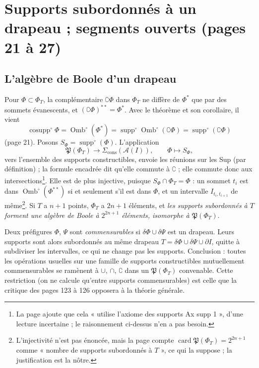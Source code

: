\documentclass[11pt,a4paper]{article}
\begin{document}
\section*{Supports subordonnés à un drapeau ; segments ouverts (pages 21 à 27)}

\subsection*{L'algèbre de Boole d'un drapeau}

Pour $\Phi \subset \Phi_{T}$, la complémentaire $\complement\Phi$ dans
$\Phi_{T}$ ne diffère de $\Phi^{*}$ que par des sommets évanescents, et
$(\complement\Phi)^{**} = \Phi^{*}$. Avec le théorème et son corollaire, il
vient
\[
\boxed{\ \operatorname{cosupp}^{\circ}\Phi = \operatorname{Omb}^{\circ}(\Phi^{*})
= \operatorname{supp}^{\circ}\operatorname{Omb}^{\circ}(\complement\Phi) =
\operatorname{supp}^{\circ}(\complement\Phi)\ }
\]
(page 21). Posons $S_{\Phi} = \operatorname{supp}^{\circ}(\Phi)$. L'application
\[
\mathfrak{P}(\Phi_{T}) \longrightarrow \Sigma_{\mathrm{cons}}(\mathcal{A}(I)),
\qquad \Phi \longmapsto S_{\Phi},
\]
vers l'ensemble des supports constructibles, envoie les réunions sur les Sup (par
définition) ; la formule encadrée dit qu'elle commute à $\complement$ ; elle
commute donc aux intersections\footnote{La page ajoute que cela « utilise
l'axiome des supports Ax supp 1 », d'une lecture incertaine ; le raisonnement
ci-dessus n'en a pas besoin.}. Elle est de plus injective, puisque $S_{\Phi} \cap
\Phi_{T} = \Phi$ : un sommet $t_{i}$ est dans $\operatorname{Omb}^{\circ}(\Phi^{**})$
si et seulement s'il est dans $\Phi$, et un intervalle $I_{t_{i},t_{i+1}}$ de
même\footnote{L'injectivité n'est pas énoncée, mais la page compte
$\operatorname{card}\mathfrak{P}(\Phi_{T}) = 2^{2n+1}$ comme « nombre de supports
subordonnés à $T$ », ce qui la suppose ; la justification est la nôtre.}. Si $T$
a $n+1$ points, $\Phi_{T}$ a $2n+1$ éléments, et \emph{les supports subordonnés à
$T$ forment une algèbre de Boole à $2^{2n+1}$ éléments, isomorphe à
$\mathfrak{P}(\Phi_{T})$}.

Deux préfigures $\Phi$, $\Psi$ sont \emph{commensurables} si $\delta\Phi \cup
\delta\Psi$ est un drapeau. Leurs supports sont alors subordonnés au même
drapeau $T = \delta\Phi \cup \delta\Psi \cup \partial I$, quitte à subdiviser les
intervalles, ce qui ne change pas les supports. Conclusion : toutes les
opérations usuelles sur une famille de supports constructibles mutuellement
commensurables se ramènent à $\cup$, $\cap$, $\complement$ dans un
$\mathfrak{P}(\Phi_{T})$ convenable. Cette restriction (on ne calcule
qu'entre supports commensurables) est celle que la critique des pages 123 à
126 opposera à la théorie générale.
\end{document}
